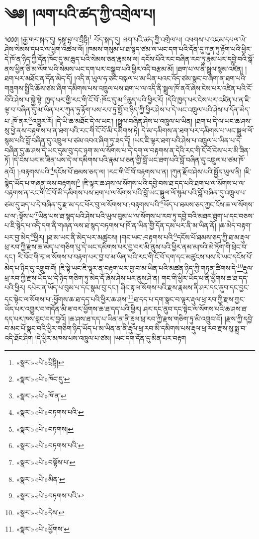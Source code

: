 \chapter{༄༅། །ལག་པའི་ཚད་ཀྱི་འགྲེལ་པ།}༄༅༅། །རྒྱ་གར་སྐད་དུ། ཧསྟཱ་བྷ་བ་བྲྀཏྟི།\footnote{«སྣར་»«པེ་»པྲིཏྟི།} བོད་སྐད་དུ། ལག་པའི་ཚད་ཀྱི་འགྲེལ་པ། འཕགས་པ་འཇམ་དཔལ་ཡེ་ཤེས་སེམས་དཔའ་ལ་ཕྱག་འཚལ་ལོ། །ཁམས་གསུམ་པ་ཐ་སྙད་ཙམ་ལ་ཡང་དག་པའི་དོན་དུ་ཀུན་ཏུ་རྟོག་པའི་ཕྱིར་དེ་ཁོ་ན་ཉིད་ཀྱི་དོན་ཁོང་དུ་མ་ཆུད་པའི་སེམས་ཅན་རྣམས་ལ། དངོས་པོའི་རང་བཞིན་རབ་ཏུ་རྣམ་པར་དབྱེ་བའི་སྒོ་ནས་ཕྱིན་ཅི་མ་ལོག་པའི་སེམས་ཡང་དག་པར་བསྒྲུབ་པའི་ཕྱིར་འདི་བརྩམ་མོ། །ཐག་པ་ལ་ནི་སྦྲུལ་སྙམ་འཛིན། །ཐག་པར་མཐོང་ན་དོན་མེད་དོ། །འདི་ན་ཡུལ་ཧ་ཅང་བསྐལ་པ་མ་ཡིན་པའང་འོད་ཙམ་སྣང་བ་ཞིག་ན་ཐག་པའི་གཟུགས་སྤྱིའི་ཆོས་ཙམ་ཞིག་དམིགས་པས་འཁྲུལ་པས་ཐག་པ་ལ་འདི་ནི་སྦྲུལ་ཁོ་ནའོ་ཞེས་ངེས་པར་འཛིན་པའི་ངོ་བོའི་ཤེས་པ་སྐྱེ་སྟེ། ཁྱད་པར་གྱི་རང་གི་ངོ་བོ་:ཁོང་དུ་མ་\footnote{«སྣར་»«པེ་»ཁོང་དུ་}ཆུད་པའི་ཕྱིར་རོ། །དེའི་ཁྱད་པར་ངེས་པར་འཛིན་པ་ན་ཇི་ལྟ་བ་བཞིན་དུ་མ་ཡིན་པར་ཀུན་ཏུ་རྟོག་པས་རབ་ཏུ་སྤྲོ་བ་ཉིད་ཀྱི་ཕྱིར་ཤེས་པ་དེ་ཡང་འཁྲུལ་པའི་ཤེས་པ་དོན་མེད་པ་:ཁོ་ནར་\footnote{«སྣར་»«པེ་»ཁོ་ན་}འགྱུར་རོ། །དེ་ཡི་ཆ་མཐོང་དེ་ལ་ཡང་། །སྦྲུལ་བཞིན་ཤེས་པ་འཁྲུལ་པ་ཡིན། །ཐག་པ་དེ་ལ་ཡང་ཆ་ཤས་སུ་ཕྱེ་ནས་བརྟགས་པ་ན་ཐག་པའི་རང་གི་ངོ་བོ་མི་དམིགས་ཏེ། དེ་མ་དམིགས་ན་ཐག་པར་དམིགས་པ་ཡང་སྦྲུལ་ལོ་སྙམ་པའི་བློ་བཞིན་དུ་འཁྲུལ་པ་ཙམ་འབའ་ཞིག་ཏུ་ཟད་དོ། །ཡང་ཇི་ལྟར་ཐག་པའི་ཤེས་པ་འཁྲུལ་པ་ཡིན་པ་དེ་བཞིན་དུ་ཆ་ཤས་དེ་ཡང་དུམ་བུ་དང་ཉག་མ་ལ་སོགས་པ་དེ་དག་ལ་བརྟགས་ན་དེའི་རང་གི་ངོ་བོ་ངེས་པར་མི་ཟིན་ཏོ། །དེ་ངེས་པར་མ་ཟིན་པས་དེ་ལ་དམིགས་པའི་རྣམ་པ་ཅན་གྱི་བློ་ཡང་ཐག་པའི་བློ་བཞིན་དུ་འཁྲུལ་པ་ཙམ་ཁོ་ནའོ། །:བརྟགས་པའི་\footnote{«སྣར་»«པེ་»བཏགས་པའི་}དངོས་པོ་ཐམས་ཅད་ལ། །རང་གི་ངོ་བོ་བརྟགས་པ་ན། །ཀུན་རྫོབ་ཤེས་པའི་སྤྱོད་ཡུལ་ནི། །ཇི་སྙེད་ཡོད་པ་གཞན་ལས་བརྟགས།\footnote{«སྣར་»«པེ་»བཏགས།} །ཇི་ལྟར་ཆ་ཤས་ལ་སོགས་པའི་དབྱེ་བས་ཐ་དད་པའི་ཐག་པ་ལ་སོགས་པ་ལ་བརྟགས་ན་རང་གི་ངོ་བོ་མི་དམིགས་པས་ཐག་པ་ལ་སོགས་པའི་བློ་ཡང་སྦྲུལ་ལོ་སྙམ་པའི་བློ་བཞིན་དུ་འཁྲུལ་པ་ཙམ་དུ་ཟད་པ་དེ་བཞིན་དུ་རྫ་མ་དང་ཕོར་བུ་ལ་སོགས་པ་:བརྟགས་པའི་\footnote{«སྣར་»«པེ་»བཏགས་པའི་}ཡོད་པ་ཐམས་ཅད་ཀྱང་ངོས་ཆ་ལ་སོགས་པ་ལ་:ལྟོས་པ་\footnote{«སྣར་»«པེ་»བལྟོས་པ་}ཡིན་པས་ཐ་སྙད་པའི་ཤེས་པའི་ཡུལ་བུམ་པ་ལ་སོགས་པ་རབ་ཏུ་དབྱེ་བའི་མཐར་ཐུག་པ་དང་བཅས་པ་ཇི་སྙེད་པ་འདི་དག་ནི་གཞན་ལས་ཐ་སྙད་བཏགས་པ་ཁོ་ན་ཡིན་གྱི་དོན་དམ་པར་ནི་མ་ཡིན་ནོ། །ཆ་མེད་བརྟག་པར་བྱ་མེད་\footnote{«སྣར་»«པེ་»མིན་}ཕྱིར། །ཐ་མ་ཡང་ནི་མེད་པར་མཚུངས། །གང་ཡང་:བརྟགས་པའི་\footnote{«སྣར་»«པེ་»བཏགས་པའི་}དངོས་པོ་ཐམས་ཅད་ཀྱི་ཐ་མ་རྡུལ་ཕྲ་རབ་ཀྱི་རྫས་ཆ་མེད་པ་གཅིག་པུ་དེ་ཡང་དམིགས་པར་བྱ་བར་མི་ནུས་པའི་ཕྱིར་ནམ་མཁའི་མེ་ཏོག་གི་ཕྲེང་བ་དང་། རི་བོང་གི་རྭ་ལ་སོགས་པ་བརྟག་པར་བྱ་བ་མ་ཡིན་པའི་རང་གི་ངོ་བོ་དག་དང་མཚུངས་པས་དེ་ཡང་དངོས་པོ་མེད་པ་ཉིད་དུ་འགྲུབ་བོ། །ཇི་སྟེ་ཡང་ཇི་ལྟར་ན་བརྟག་པར་བྱ་བ་མ་ཡིན་པའི་མཚན་ཉིད་ཀྱི་གཏན་ཚིགས་དེ་\footnote{«སྣར་»«པེ་»དེས་}རྡུལ་ཕྲ་རབ་ཀྱི་རྫས་ཡོད་པ་དེ་ཉིད་གཅིག་ཏུ་མེད་དོ་ཞེས་ཤེས་པར་ནུས་ཤེ་ན། གང་གི་ཕྱིར་ཡོད་པ་ནི་ཕྱོགས་ཆ་ཐ་དད་པའི་ཕྱིར། དཔེར་ན་ཡོད་པ་བུམ་པ་དང་སྣམ་བུ་དང་། ཤིང་རྟ་ལ་སོགས་པའི་རྫས་རྣམས་ནི་ཤར་དང་ནུབ་དང་བྱང་དང་སྟེང་ལ་སོགས་པ་:ཕྱོགས་ཆ་ཐ་དད་པའི་ཕྱིར་ཆ་ཤས་\footnote{«སྣར་»«པེ་»ཕྱོགས་}ཐ་དད་པ་དག་སྣང་བ་ལྟར་རྡུལ་ཕྲ་རབ་ཀྱི་རྫས་ཀྱང་ཡོད་པར་འགྱུར་བ་གདོན་མི་ཟ་བར་ཕྱོགས་ཆ་ཐ་དད་པའི་ཕྱིར། ཤར་དང་ནུབ་དང་སྟེང་ལ་སོགས་པའི་ཆ་ཤས་ཐ་དད་པར་ཁས་བླང་བར་བྱའོ། །ཆ་ཤས་ཐ་དད་པ་ཡིན་ན་ནི་རྡུལ་ཕྲ་རབ་ཀྱི་རྫས་གཅིག་ཏུ་མི་འགྲུབ་བོ། །རྫས་ཀྱི་དབྱེ་བ་མང་པོ་སྣང་བའི་ཕྱིར་གཅིག་ཉིད་ཡོད་པ་མ་ཡིན་ན་ནི་རྡུལ་ཕྲ་རབ་མི་དམིགས་པས་རྡུལ་ཕྲ་རབ་རྫས་སུ་སྨྲ་བ་འདི་ཐོང་ཤིག །དེ་ཕྱིར་མཁས་པས་འཁྲུལ་པ་ཙམ། །ཡང་དག་དོན་དུ་མིན་པར་བརྟག 